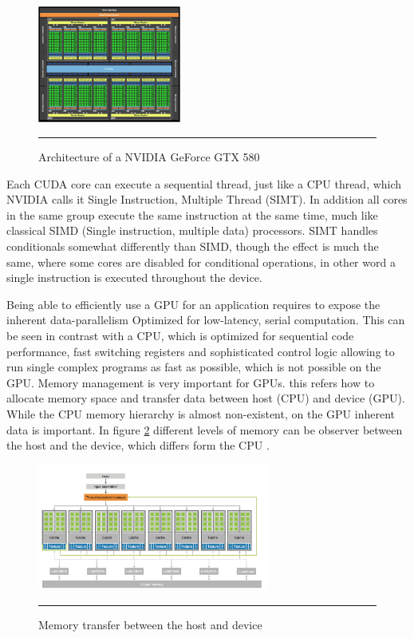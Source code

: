 \begin{figure}[htbp]
	\centering
		\includegraphics[width=0.42\textwidth]{Figures/GPU_CPU.png}
		\rule{35em}{0.5pt}
	\caption[Architecture of a GPU]{Architecture of a NVIDIA GeForce GTX 580}
	\label{fig:gpu_cpu}
\end{figure}


Each CUDA core  can execute a sequential thread, just like a CPU thread, which NVIDIA calls it Single Instruction, Multiple Thread (SIMT). In addition all cores in the same group execute the same instruction at the same time, much like classical SIMD (Single instruction, multiple data) processors. SIMT handles conditionals somewhat differently than SIMD, though the effect is much the same, where some cores are disabled for conditional operations, in other word a single instruction is executed throughout the device.

Being able to efficiently use a GPU for an application requires to expose the inherent data-parallelism Optimized for low-latency, serial computation. This can be seen in contrast with a CPU, which is optimized for sequential code performance, fast switching registers  and sophisticated control logic allowing to run single complex programs as fast as possible, which is not possible on the GPU. Memory management is very important for GPUs. this refers how to allocate memory space and transfer data between host (CPU) and device (GPU). While the CPU memory hierarchy is almost non-existent, on the GPU inherent data is important. In figure \ref{fig:arch} different levels of memory can be observer between the host and the device, which differs form the CPU \cite{hwu}.

\begin{figure}[htbp]
	\centering
		\includegraphics[width=0.68\textwidth]{Figures/arch.png}
		\rule{35em}{0.5pt}
	\caption[Host and Device]{Memory transfer between the host and device}
	\label{fig:arch}
\end{figure}


